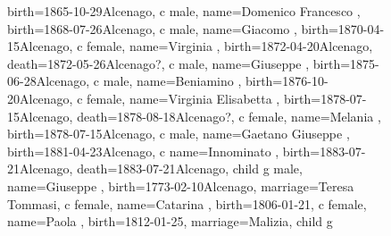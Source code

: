 \documentclass{article}
\begin{document}
\begin{figure}
\begin{genealogypicture}
{{{{{                        birth={1865-10-29}{Alcenago},
                    }
                    c{
                        male,
                        name={Domenico Francesco },
                        birth={1868-07-26}{Alcenago},
                    }
                    c{
                        male,
                        name={Giacomo },
                        birth={1870-04-15}{Alcenago},
                    }
                    c{
                        female,
                        name={Virginia },
                        birth={1872-04-20}{Alcenago},
                        death={1872-05-26}{Alcenago?},
                    }
                    c{
                        male,
                        name={Giuseppe },
                        birth={1875-06-28}{Alcenago},
                    }
                    c{
                        male,
                        name={Beniamino },
                        birth={1876-10-20}{Alcenago},
                    }
                    c{
                        female,
                        name={Virginia Elisabetta },
                        birth={1878-07-15}{Alcenago},
                        death={1878-08-18}{Alcenago?},
                    }
                    c{
                        female,
                        name={Melania },
                        birth={1878-07-15}{Alcenago},
                    }
                    c{
                        male,
                        name={Gaetano Giuseppe },
                        birth={1881-04-23}{Alcenago},
                    }
                    c{
                        name={Innominato },
                        birth={1883-07-21}{Alcenago},
                        death={1883-07-21}{Alcenago},
                    }
                }
            }
            child{
                g{
                    male,
                    name={Giuseppe },
                    birth={1773-02-10}{Alcenago},
                    marriage={Teresa Tommasi}{},
                }
                c{
                    female,
                    name={Catarina },
                    birth={1806-01-21}{},
                }
                c{
                    female,
                    name={Paola },
                    birth={1812-01-25}{},
                    marriage={Malizia}{},
                }
                child{
                    g{
}}}}}
\end{genealogypicture}
\end{figure}
\end{document}

